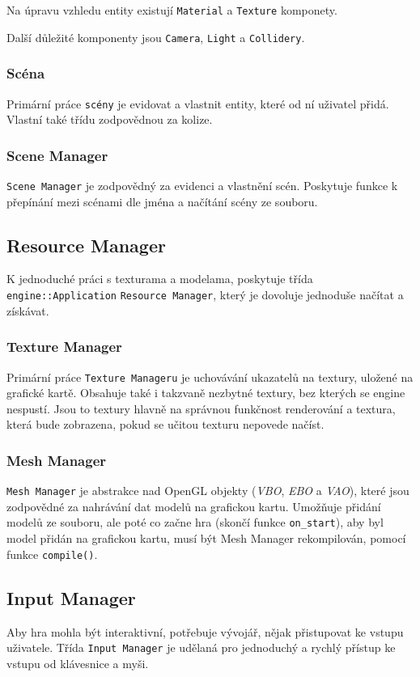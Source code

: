 \documentclass[12pt,a4paper]{article}
\begin{document}
Na úpravu vzhledu entity existují \texttt{Material} a \texttt{Texture} komponety.

Další důležité komponenty jsou \texttt{Camera}, \texttt{Light} a \texttt{Collidery}.

\subsubsection{Scéna}
Primární práce \texttt{scény} je evidovat a vlastnit entity, které od ní uživatel přidá. Vlastní také třídu zodpovědnou za kolize.

\subsubsection{Scene Manager}
\texttt{Scene Manager} je zodpovědný za evidenci a vlastnění scén. Poskytuje funkce k přepínání mezi scénami dle jména a načítání scény ze souboru.


\subsection{Resource Manager}
K jednoduché práci s texturama a modelama, poskytuje třída \texttt{engine::Application} \texttt{Resource Manager}, který je dovoluje jednoduše načítat a získávat. 

\subsubsection{Texture Manager}
Primární práce \texttt{Texture Manageru} je uchovávání ukazatelů na textury, uložené na grafické kartě. Obsahuje také i takzvaně nezbytné textury, bez kterých se engine nespustí. Jsou to textury hlavně na správnou funkčnost renderování a textura, která bude zobrazena, pokud se učitou texturu nepovede načíst.

\subsubsection{Mesh Manager}
\texttt{Mesh Manager} je abstrakce nad OpenGL objekty (\textit{VBO}, \textit{EBO} a \textit{VAO}), které jsou zodpovědné za nahrávání dat modelů na grafickou kartu. Umožňuje přidání modelů ze souboru, ale poté co začne hra (skončí funkce \texttt{on\_start}), aby byl model přidán na grafickou kartu, musí být Mesh Manager rekompilován, pomocí funkce \texttt{compile()}.

\subsection{Input Manager} \label{sec:input-manager}
Aby hra mohla být interaktivní, potřebuje vývojář, nějak přistupovat ke vstupu uživatele. Třída \texttt{Input Manager} je udělaná pro jednoduchý a rychlý přístup ke vstupu od klávesnice a myši.
\end{document}
